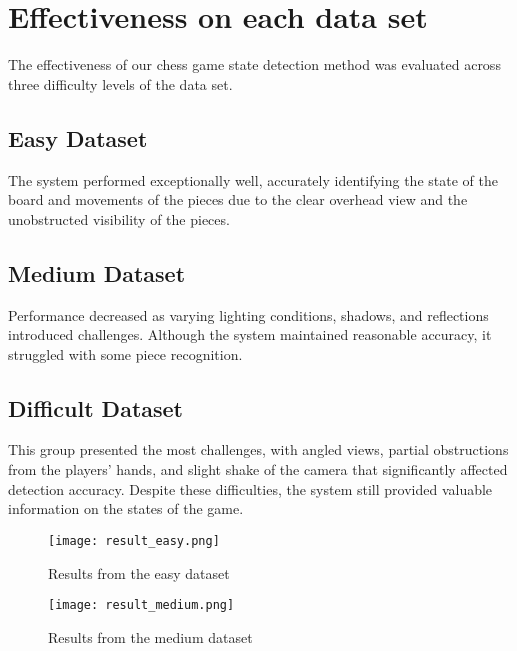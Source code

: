 \documentclass{article}
\begin{document}
\newpage

\section{Effectiveness on each data set}
The effectiveness of our chess game state detection method was evaluated across three difficulty levels of the data set.
\subsection{Easy Dataset}
The system performed exceptionally well, accurately identifying the state of the board and movements of the pieces due to the clear overhead view and the unobstructed visibility of the pieces.
\subsection{Medium Dataset}
Performance decreased as varying lighting conditions, shadows, and reflections introduced challenges. Although the system maintained reasonable accuracy, it struggled with some piece recognition.
\subsection{Difficult Dataset}
This group presented the most challenges, with angled views, partial obstructions from the players' hands, and slight shake of the camera that significantly affected detection accuracy. Despite these difficulties, the system still provided valuable information on the states of the game.

\begin{figure}[!htbp]
    \centering
    \begin{minipage}{.5\textwidth}
        \centering
        \texttt{[image: result\_easy.png]}
        \caption{Results from the easy dataset}
        \label{fig:prob1_6_2}
    \end{minipage}%
    \begin{minipage}{0.5\textwidth}
        \centering
        \texttt{[image: result\_medium.png]}
        \caption{Results from the medium dataset}
        \label{fig:prob1_6_1}
    \end{minipage}
\end{figure}
\end{document}
